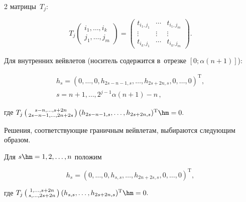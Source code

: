 \begin{multicols}{2}
 матрицы~${T}_j$:


$$


T_j\left(\begin{smallmatrix} 


i_1,\dots,i_k \\ j_1,\dots,j_m \end{smallmatrix} 


\right) = 


\begin{pmatrix} t_{i_1,j_1} & \cdots & t_{i_1,j_m} \\ 


\vdots & \vdots&\vdots \\ 


t_{i_k,j_1} & \cdots & t_{i_k,j_m} 


\end{pmatrix}.


$$


Для внутренних вейвлетов (носитель содержится в~отрезке $[0;\alpha (n+1)]$):


\begin{multline*}


{h}_s=(0,\dots,0,h_{2s-n-1,s},\dots, h_{2s+2n,s},0,\dots,0)^{\mathrm{T}},


\\


 s=n+1,\dots,2^{j-1}\alpha (n+1)-n\,,


\end{multline*}


 где $ T_j\left(\begin{smallmatrix} s-n,\dots,s+2n \\ 


 2s-n-1,\dots,2n+2s \end{smallmatrix} \right)(h_{2s-n-1,s},\dots,h_{2s+2n,s})^{\mathrm{T}}\hm=0.$





Решения, соответствующие граничным вейвлетам, выбираются следующим образом. 


Для $s\hm=1,2,\dots,n$ положим


$$


{h}_{s}=(0,\dots,0,h_{s,s},\dots,h_{2n+2s,s},0,\dots,0)^{\mathrm{T}},


$$


где $T_j\left(\begin{smallmatrix} 1,\dots,s+2n \\ 


s,\dots,2s+2n\end{smallmatrix} \right)(h_{s,s},\dots,h_{2s+2n,s})^{\mathrm{T}}\hm=0.$



\end{multicols}
